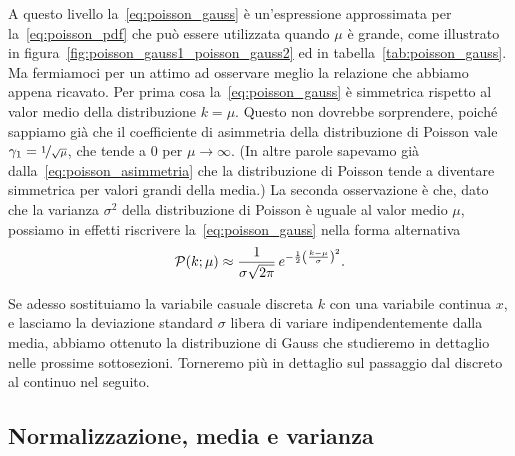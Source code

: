 

A questo livello la~\eqref{eq:poisson_gauss} è un'espressione approssimata per
la~\eqref{eq:poisson_pdf} che può essere utilizzata quando $\mu$ è grande,
come illustrato in figura~\ref{fig:poisson_gauss1_poisson_gauss2} ed in
tabella~\ref{tab:poisson_gauss}. Ma fermiamoci per un attimo ad osservare meglio
la relazione che abbiamo appena ricavato.
Per prima cosa la~\eqref{eq:poisson_gauss} è simmetrica rispetto al valor
medio della distribuzione $k =\mu$. Questo non dovrebbe sorprendere, poiché
sappiamo già che il coefficiente di asimmetria della distribuzione di Poisson
vale $\displaystyle \gamma_1 = \nicefrac{1}{\sqrt{\mu}}$, che tende a $0$ per
$\mu \rightarrow \infty$. (In altre parole sapevamo già
dalla~\eqref{eq:poisson_asimmetria} che la distribuzione di Poisson tende a
diventare simmetrica per valori grandi della media.) La seconda osservazione è
che, dato che la varianza $\sigma^2$ della distribuzione di Poisson è uguale
al valor medio $\mu$, possiamo in effetti riscrivere la~\eqref{eq:poisson_gauss}
nella forma alternativa
\begin{align*}
  \poissonpdf[\mu]{k} \approx
  \frac{1}{\sigma\sqrt{2\pi}}\,e^{-\frac{1}{2}\left(\frac{k - \mu}{\sigma}\right)^2}.
\end{align*}

Se adesso sostituiamo la variabile casuale discreta $k$ con una variabile
continua $x$, e lasciamo la deviazione standard $\sigma$ libera di variare
indipendentemente dalla media, abbiamo ottenuto la distribuzione di Gauss che
studieremo in dettaglio nelle prossime sottosezioni. Torneremo più in
dettaglio sul passaggio dal discreto al continuo nel seguito.


\subsection{Normalizzazione, media e varianza}

